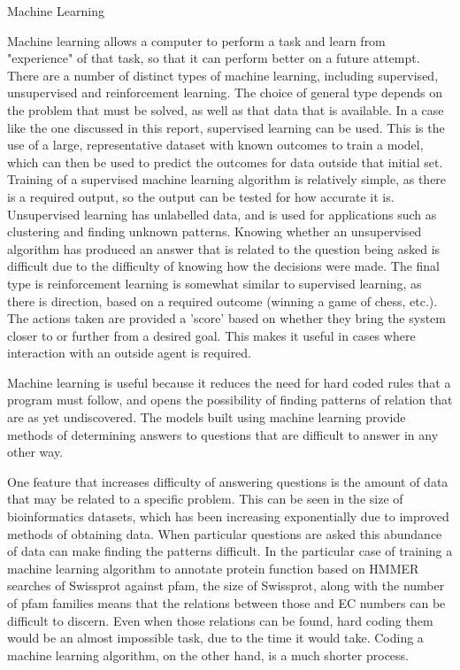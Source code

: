 \documentclass[12pt]{article}
\makeatletter
\renewcommand\subsection{\@startsection{subsection}{4}{\z@}
            {-2.5ex\@plus -1ex \@minus -.25ex}
            {1ex \@plus .25ex}
            {\normalfont\Large\bfseries}}
\makeatother
\begin{document}
		\subsection{Machine Learning}
		
			Machine learning allows a computer to perform a task and learn from "experience" of that task, so that it can perform better on a future attempt.  There are a number of distinct types of machine learning, including supervised, unsupervised and reinforcement learning.  The choice of general type depends on the problem that must be solved, as well as that data that is available.  In a case like the one discussed in this report, supervised learning can be used.  This is the use of a large, representative dataset with known outcomes to train a model, which can then be used to predict the outcomes for data outside that initial set.  Training of a supervised machine learning algorithm is relatively simple, as there is a required output, so the output can be tested for how accurate it is.  Unsupervised learning has unlabelled data, and is used for applications such as clustering and finding unknown patterns.  Knowing whether an unsupervised algorithm has produced an answer that is related to the question being asked is difficult due to the difficulty of knowing how the decisions were made.  The final type is reinforcement learning is somewhat similar to supervised learning, as there is direction, based on a required outcome (winning a game of chess, etc.).  The actions taken are provided a 'score' based on whether they bring the system closer to or further from a desired goal.  This makes it useful in cases where interaction with an outside agent is required.
		
			Machine learning is useful because it reduces the need for hard coded rules that a program must follow, and opens the possibility of finding patterns of relation that are as yet undiscovered.  The models built using machine learning provide methods of determining answers to questions that are difficult to answer in any other way.  
		
			One feature that increases difficulty of answering questions is the amount of data that may be related to a specific problem.  This can be seen in the size of bioinformatics datasets, which has been increasing exponentially due to improved methods of obtaining data.  When particular questions are asked this abundance of data can make finding the patterns difficult.  In the particular case of training a machine learning algorithm to annotate protein function based on HMMER searches of Swissprot against pfam, the size of Swissprot, along with the number of pfam families means that the relations between those and EC numbers can be difficult to discern.  Even when those relations can be found, hard coding them would be an almost impossible task, due to the time it would take.  Coding a machine learning algorithm, on the other hand, is a much shorter process.
			
\end{document}

